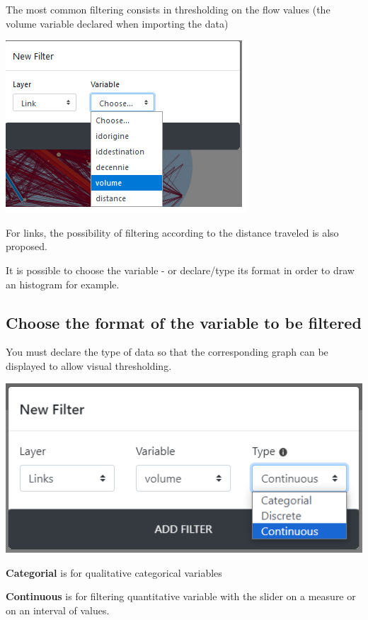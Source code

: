 \documentclass[
  letterpaper,
  DIV=11,
  numbers=noendperiod]{scrreprt}
\begin{document}
The most common filtering consists in thresholding on the flow values
(the volume variable declared when importing the data)

\includegraphics{images/Add_filter_links_volume.png}

For links, the possibility of filtering according to the distance
traveled is also proposed.

It is possible to choose the variable - or declare/type its format in
order to draw an histogram for example.

\subsection{Choose the format of the variable to be
filtered}\label{choose-the-format-of-the-variable-to-be-filtered}

You must declare the type of data so that the corresponding graph can be
displayed to allow visual thresholding.

\includegraphics{images/Add_filter_links_volume_continuous.png}

\textbf{Categorial} is for qualitative categorical variables

\textbf{Continuous} is for filtering quantitative variable with the
slider on a measure or on an interval of values.
\end{document}
